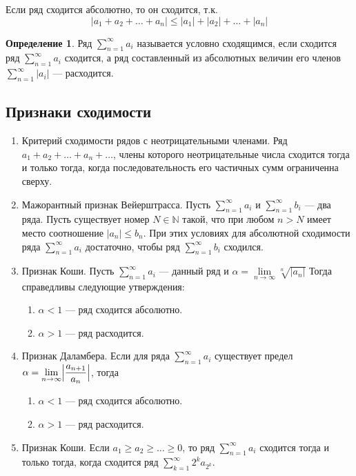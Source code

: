 \documentclass[12pt]{report}
\theoremstyle{definition}
\newtheorem{definition}[theorem]{Определение}
\newcommand{\N}{\mathbb N}
\begin{document}
Если ряд сходится абсолютно, то он сходится, т.к.
$$
|a_1 + a_2 + \dots + a_n| \le |a_1| + |a_2| + \dots + |a_n|
$$

\begin{definition}
Ряд $\sum\limits_{n=1}^\infty a_i$ называется условно сходящимся,
если сходится ряд $\sum\limits_{n=1}^\infty a_i$ сходится, а ряд составленный
из абсолютных величин его членов $\sum\limits_{n=1}^\infty |a_i|$ --- расходится.
\end{definition}

\subsection{Признаки сходимости}
\begin{enumerate}
\item Критерий сходимости рядов с неотрицательными членами.
  Ряд $a_1 + a_2 + \dots + a_n + \dots$, члены которого неотрицательные числа
  сходится тогда и только тогда, когда последовательность его частичных сумм
  ограниченна сверху.
\item Мажорантный признак Вейерштрасса.
  Пусть $\sum\limits_{n=1}^\infty a_i$ и $\sum\limits_{n=1}^\infty b_i$ --- два ряда.
  Пусть существует номер $N \in \N$ такой, что при любом $n > N$ имеет место соотношение
  $|a_n| \le b_n$. При этих условиях для абсолютной сходимости ряда $\sum\limits_{n=1}^\infty a_i$
  достаточно, чтобы ряд $\sum\limits_{n=1}^\infty b_i$ сходился.
\item Признак Коши.
  Пусть $\sum\limits_{n=1}^\infty a_i$ --- данный ряд и
  $\alpha = \lim\limits_{n \rightarrow \infty} \sqrt[n]{|a_n|}$
  Тогда справедливы следующие утверждения:
  \begin{enumerate}
    \item $\alpha < 1$ --- ряд сходится абсолютно.
    \item $\alpha > 1$ --- ряд расходится.
  \end{enumerate}
\item Признак Даламбера.
  Если для ряда $\sum\limits_{n=1}^\infty a_i$ существует предел
  $\alpha = \lim\limits_{n \rightarrow \infty} \Bigl |\dfrac{a_{n + 1}}{a_n}\Bigl |$,
  тогда
  \begin{enumerate}
    \item $\alpha < 1$ --- ряд сходится абсолютно.
    \item $\alpha > 1$ --- ряд расходится.
  \end{enumerate}
\item Признак Коши.
  Если $a_1 \ge a_2 \ge \dots \ge 0$, то ряд $\sum\limits_{n=1}^\infty a_i$ сходится
  тогда и только тогда, когда сходится ряд $\sum\limits_{k=1}^\infty 2^k a_{2^k}$.
\end{enumerate}
\end{document}

